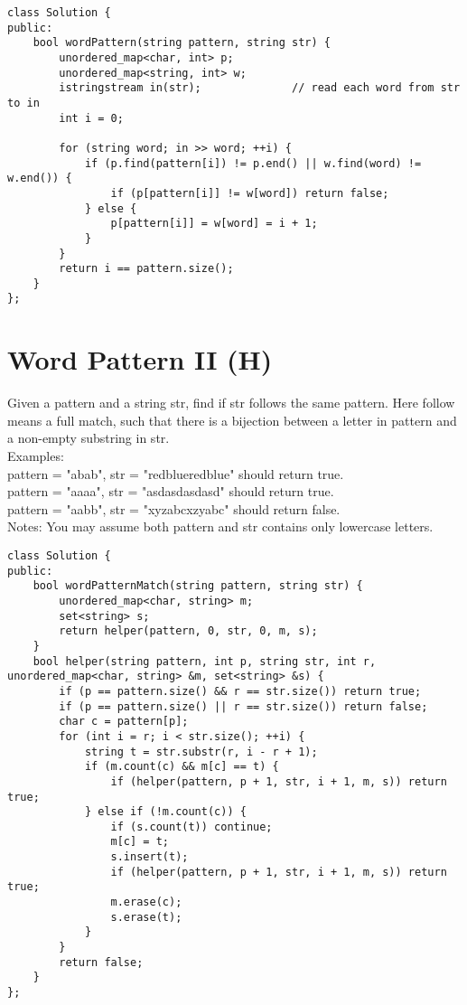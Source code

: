 \begin{lstlisting}
class Solution {
public:
    bool wordPattern(string pattern, string str) {
        unordered_map<char, int> p;
        unordered_map<string, int> w;
        istringstream in(str);              // read each word from str to in
        int i = 0;
        
        for (string word; in >> word; ++i) {
            if (p.find(pattern[i]) != p.end() || w.find(word) != w.end()) {
                if (p[pattern[i]] != w[word]) return false;
            } else {
                p[pattern[i]] = w[word] = i + 1;
            }
        }
        return i == pattern.size();
    }
};
\end{lstlisting}


\section{Word Pattern II (H)}
Given a pattern and a string str, find if str follows the same pattern. Here follow means a full match, such that there is a bijection between a letter in pattern and a non-empty substring in str.\\

Examples:\\
    pattern = "abab", str = "redblueredblue" should return true.\\
    pattern = "aaaa", str = "asdasdasdasd" should return true.\\
    pattern = "aabb", str = "xyzabcxzyabc" should return false.\\

Notes: You may assume both pattern and str contains only lowercase letters.\\

\begin{lstlisting}
class Solution {
public:
    bool wordPatternMatch(string pattern, string str) {
        unordered_map<char, string> m;
        set<string> s;
        return helper(pattern, 0, str, 0, m, s);
    }
    bool helper(string pattern, int p, string str, int r, unordered_map<char, string> &m, set<string> &s) {
        if (p == pattern.size() && r == str.size()) return true;
        if (p == pattern.size() || r == str.size()) return false;
        char c = pattern[p];
        for (int i = r; i < str.size(); ++i) {
            string t = str.substr(r, i - r + 1);
            if (m.count(c) && m[c] == t) {
                if (helper(pattern, p + 1, str, i + 1, m, s)) return true;
            } else if (!m.count(c)) {
                if (s.count(t)) continue;
                m[c] = t;
                s.insert(t);
                if (helper(pattern, p + 1, str, i + 1, m, s)) return true;
                m.erase(c);
                s.erase(t);
            }
        }
        return false;
    }
};
\end{lstlisting}


